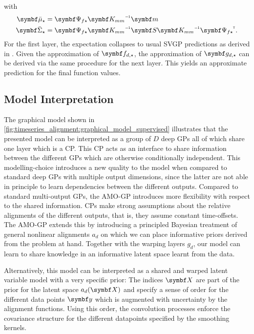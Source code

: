 with 
\begin{align*}
    \mat{\bar{\mu}_{\star}} &= \mat{\Psi_{f\star}} \mat{K_{mm}}\inv \mat{m}  \\
    \mat{\bar{\Sigma}_{\star}} &= \mat{\Psi_{f\star}}\mat{K_{mm}}\inv\mat{S}\mat{K_{mm}}\inv\mat{\Psi_{f\star}}\tran.
\end{align*}
For the first layer, the expectation collapses to usual SVGP predictions as derived in \cite{hensman_scalable_2015}.
Given the approximation of $\rv{f_{d, \star}}$, the approximation of $\rv{g_{d, \star}}$ can be derived via the same procedure for the next layer.
This yields an approximate prediction for the final function values.


\subsection{Model Interpretation}
\label{sub:timeseries_alignment:interpretation}
The graphical model shown in \cref{fig:timeseries_alignment:graphical_model_supervised} illustrates that the presented model can be interpreted as a group of $D$ deep GPs all of which share one layer which is a CP.
This CP acts as an interface to share information between the different GPs which are otherwise conditionally independent.
This modelling-choice introduces a new quality to the model when compared to standard deep GPs with multiple output dimensions, since the latter are not able in principle to learn dependencies between the different outputs.
Compared to standard multi-output GPs, the AMO-GP introduces more flexibility with respect to the shared information.
CPs make strong assumptions about the relative alignments of the different outputs, that is, they assume constant time-offsets.
The AMO-GP extends this by introducing a principled Bayesian treatment of general nonlinear alignments $a_d$ on which we can place informative priors derived from the problem at hand.
Together with the warping layers $g_d$, our model can learn to share knowledge in an informative latent space learnt from the data.

Alternatively, this model can be interpreted as a shared and warped latent variable model with a very specific prior:
The indices $\mat{X}$ are part of the prior for the latent space $a_d(\mat{X})$ and specify a sense of order for the different data points $\mat{y}$ which is augmented with uncertainty by the alignment functions.
Using this order, the convolution processes enforce the covariance structure for the different datapoints specified by the smoothing kernels.

